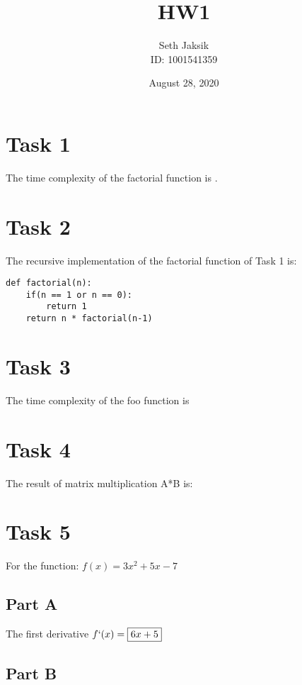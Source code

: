 \documentclass{article}
\title{HW1}
\author{Seth Jaksik \\ ID: 1001541359}
\date{August 28, 2020}
\begin{document}
\maketitle

\section*{Task 1}

The time complexity of the factorial function is . 

\section*{Task 2}

The recursive implementation of the factorial function of Task 1 is:

\begin{lstlisting}
def factorial(n):
    if(n == 1 or n == 0):
        return 1
    return n * factorial(n-1)
\end{lstlisting}

\section*{Task 3}

The time complexity of the foo function is 

\section*{Task 4}

The result of matrix multiplication A*B is:


\section*{Task 5}

For the function: $f(x) = 3x^2 + 5x - 7$

\subsection*{Part A}

The first derivative $f`(x) = \boxed{6x+5}$

\subsection*{Part B}
\end{document}
